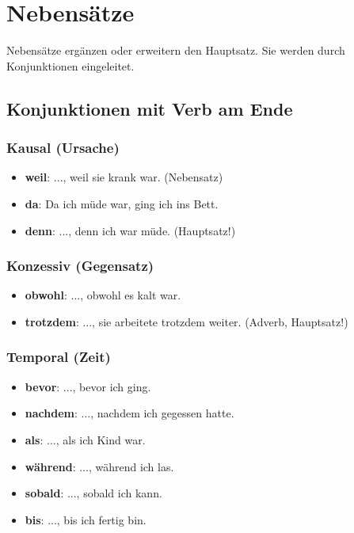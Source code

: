 \chapter{Nebensätze}
\label{cha:Nebensaetze}

Nebensätze ergänzen oder erweitern den Hauptsatz. Sie werden durch Konjunktionen eingeleitet.

\section{Konjunktionen mit Verb am Ende}
\label{sec:Konjunktionen}

\subsection{Kausal (Ursache)}
\begin{itemize}
    \item \textbf{weil}: ..., weil sie krank war. (Nebensatz)
    \item \textbf{da}: Da ich müde war, ging ich ins Bett.
    \item \textbf{denn}: ..., denn ich war müde. (Hauptsatz!)
\end{itemize}

\subsection{Konzessiv (Gegensatz)}
\begin{itemize}
    \item \textbf{obwohl}: ..., obwohl es kalt war.
    \item \textbf{trotzdem}: ..., sie arbeitete trotzdem weiter. (Adverb, Hauptsatz!)
\end{itemize}

\subsection{Temporal (Zeit)}
\begin{itemize}
    \item \textbf{bevor}: ..., bevor ich ging.
    \item \textbf{nachdem}: ..., nachdem ich gegessen hatte.
    \item \textbf{als}: ..., als ich Kind war.
    \item \textbf{während}: ..., während ich las.
    \item \textbf{sobald}: ..., sobald ich kann.
    \item \textbf{bis}: ..., bis ich fertig bin.
\end{itemize}

